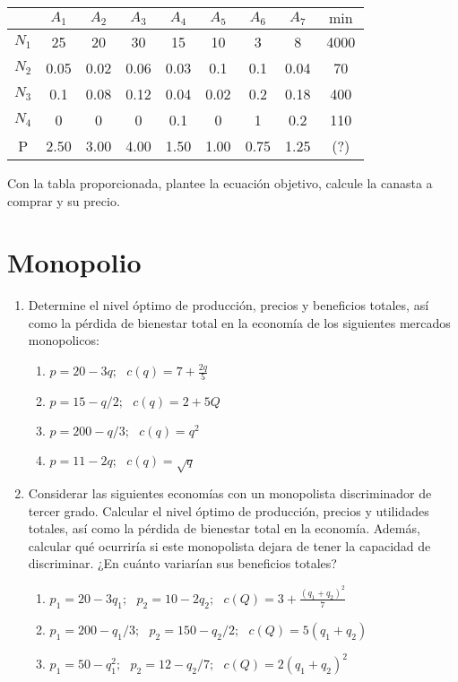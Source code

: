 \documentclass[11pt]{article}
\begin{document}
\begin{flushleft}
\begin{enumerate}[label=\Alph*)]
    \begin{table}[h]
        \centering
        \begin{tabular}{|c|c|c|c|c|c|c|c||c|}
            \hline
            & $A_1$ & $A_2$ & $A_3$ & $A_4$ & $A_5$ & $A_6$ & $A_7$ & $\min$ \\
            \hline
            $N_1$ & 25 & 20 & 30 & 15 & 10 & 3 & 8 & 4000 \\
            \hline
            $N_2$ & 0.05 & 0.02 & 0.06 & 0.03 & 0.1 & 0.1 & 0.04 & 70 \\
            \hline
            $N_3$ & 0.1 & 0.08 & 0.12 & 0.04 & 0.02 & 0.2 & 0.18 & 400 \\
            \hline
            $N_4$ & 0 & 0 & 0 & 0.1 & 0 & 1 & 0.2 & 110 \\
            \hline
            P & 2.50 & 3.00 & 4.00 & 1.50 & 1.00 & 0.75 & 1.25 & (?)\\
            \hline
        \end{tabular}
    \end{table}

    Con la tabla proporcionada, plantee la ecuación objetivo, calcule la canasta a comprar y su precio.
\end{enumerate}

\section{Monopolio}

\begin{enumerate}[label=\Alph*)]
    \item Determine el nivel óptimo de producción, precios y beneficios totales, así como la pérdida de bienestar total en la economía de los siguientes mercados monopolicos:
    \begin{enumerate}[label=\roman*)]
        \item $p=20-3q;~~~c(q)=7+\frac{2q}{5}$
        \item $p=15-q/2;~~~c(q)=2+5Q$
        \item $p=200-q/3;~~~c(q)=q^2$
        \item $p=11-2q;~~~c(q)=\sqrt{q}$
    \end{enumerate}
    \item Considerar las siguientes economías con un monopolista discriminador de tercer grado. Calcular el nivel óptimo de producción, precios y utilidades totales, así como la pérdida de bienestar total en la economía. Además, calcular qué ocurriría si este monopolista dejara de tener la capacidad de discriminar. ¿En cuánto variarían sus beneficios totales?
    \begin{enumerate}[label=\roman*)]
        \item $p_1=20-3q_1;~~~p_2=10-2q_2;~~~c(Q)=3+\frac{(q_1+q_2)^2}{7}$
        \item $p_1=200-q_1/3;~~~p_2=150-q_2/2;~~~c(Q)=5(q_1+q_2)$
        \item $p_1=50-q_1^2;~~~p_2=12-q_2/7;~~~c(Q)=2(q_1+q_2)^2$
    \end{enumerate}
\end{enumerate}


\end{flushleft}
\end{document}
